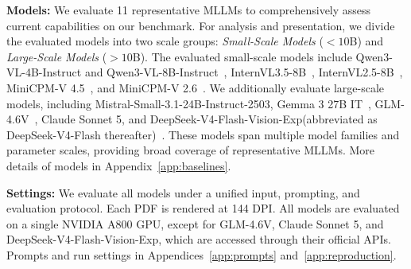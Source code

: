 \documentclass{article} %
\begin{document}
\textbf{Models:}
We evaluate 11 representative MLLMs to comprehensively assess current capabilities on our benchmark. For analysis and presentation, we divide the evaluated models into two scale groups:
\textit{Small-Scale Models} ($<10$B) and \textit{Large-Scale Models} ($>10$B). The evaluated small-scale models include Qwen3-VL-4B-Instruct and Qwen3-VL-8B-Instruct~\citep{bai2025qwen3}, InternVL3.5-8B~\citep{wang2025internvl3}, InternVL2.5-8B~\citep{chen2024expanding}, MiniCPM-V 4.5~\citep{yu2026minicpm}, and MiniCPM-V 2.6~\citep{yao2024minicpm}. We additionally evaluate large-scale models, including Mistral-Small-3.1-24B-Instruct-2503, Gemma 3 27B IT~\citep{team2025gemma}, GLM-4.6V~\citep{hong2025glm}, Claude Sonnet 5, and DeepSeek-V4-Flash-Vision-Exp(abbreviated as DeepSeek-V4-Flash thereafter)~\citep{xu2026deepseek}. These models span multiple model families and parameter scales, providing broad coverage of representative MLLMs. More details of models in Appendix~\ref{app:baselines}. 

\textbf{Settings:}
We evaluate all models under a unified input, prompting, and evaluation protocol. Each PDF is rendered at 144 DPI. All models are evaluated on a single NVIDIA A800 GPU, except for GLM-4.6V, Claude Sonnet 5, and DeepSeek-V4-Flash-Vision-Exp, which are accessed through their official APIs. Prompts and run settings in Appendices~\ref{app:prompts} and~\ref{app:reproduction}. 
\end{document}
